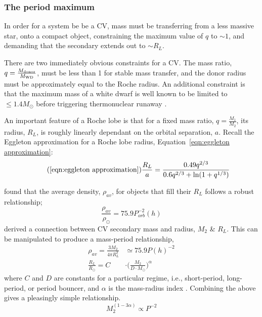 \subsubsection{The period maximum}
\label{sect:introduction:period maximum}
In order for a system be be a CV, mass must be transferring from a less massive star, onto a compact object, constraining the maximum value of $q$ to $\sim1$, and demanding that the secondary extends out to $\sim R_L$. 

There are two immediately obvious constraints for a CV. The mass ratio, $q = \frac{M_{\rm donor}}{M_{\rm WD}}$, must be less than 1 for stable mass transfer, and the donor radius must be approximately equal to the Roche radius.
An additional constraint is that the maximum mass of a white dwarf is well known to be limited to $\le 1.4M_{\odot}$ before triggering thermonuclear runaway \citep{chandrasekhar1942}.

An important feature of a Roche lobe is that for a fixed mass ratio, $q=\frac{M_1}{M_2}$, its radius, $R_L$, is roughly linearly dependant on the orbital separation, $a$. Recall the Eggleton approximation for a Roche lobe radius, Equation~\ref{eqn:eggleton approximation}:
\begin{equation}
    \tag{\ref{eqn:eggleton approximation}}
    \frac{R_L}{a} = \frac{0.49 q^{2/3}}{0.6 q^{2/3} + \mathrm{ln}(1 + q^{1/3})}
\end{equation}

\citet{warner1995} found that the average density, $\rho_{av}$, for objects that fill their $R_L$ follows a robust relationship;
\begin{equation}
    \frac{\rho_{av}}{\rho_{\odot}} = 75.9 P_{orb}^{-2}(h)
\end{equation}
\citet{knigge11} derived a connection between CV secondary mass and radius, $M_2$ \& $R_L$. This can be manipulated to produce a mass-period relationship,
\begin{align}
    \rho_{av} = \frac{3 M_2}{4 \pi R_L^3} &\simeq 75.9 P(h)^{-2} \\
    \frac{R_L}{R_\odot} = C &\cdot \Big( \frac{M_2}{D \cdot M_\odot} \Big) ^{\alpha}
\end{align}
where $C$ and $D$ are constants for a particular regime, i.e., short-period, long-period, or period bouncer, and $\alpha$ is the mass-radius index \citep{Knigge2011b}.
Combining the above gives a pleasingly simple relationship.
\begin{equation}
\label{eqn:MP_relation}
    M_2^{(1-3\alpha)} \propto P^{-2}
\end{equation}

